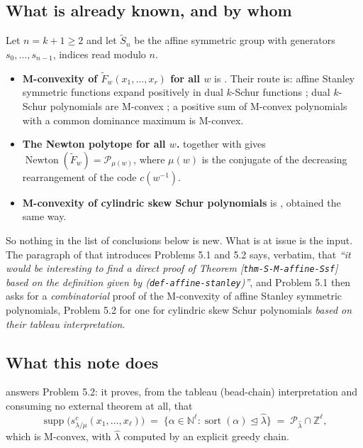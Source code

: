 \documentclass[11pt]{article}
\theoremstyle{plain}
\theoremstyle{definition}
\DeclareMathOperator{\supp}{supp}
\DeclareMathOperator{\Newton}{Newton}
\DeclareMathOperator{\sort}{sort}
\newcommand{\Z}{\mathbb{Z}}
\newcommand{\N}{\mathbb{N}}
\newcommand{\Saff}{\widetilde{S}_{n}}
\newcommand{\Fw}{\widetilde{F}_{w}}
\newcommand{\Perm}{\mathcal{P}}
\begin{document}
\subsection{What is already known, and by whom}\label{ss:known}

Let $n=k+1\ge 2$ and let $\Saff$ be the affine symmetric group with generators
$s_0,\dots,s_{n-1}$, indices read modulo $n$.

\begin{itemize}
\item \textbf{M-convexity of $\Fw(x_1,\dots,x_r)$ for all $w$} is
\cite[\texttt{thm-SNP-affine-Ssf}]{WZZ}. Their route is: affine Stanley symmetric functions
expand positively in dual $k$-Schur functions \cite[Cor.~8.5]{Lam2008}; dual $k$-Schur
polynomials are M-convex \cite[Thm.~4.4]{WZZ}; a positive sum of M-convex polynomials with a
common dominance maximum is M-convex.
\item \textbf{The Newton polytope for all $w$.} \cite[\texttt{thm-SNP-affine-Schur-combin}]{WZZ}
together with \cite[\texttt{thm:monomial}]{Lam2006} gives
$\Newton(\Fw)=\Perm_{\mu(w)}$, where $\mu(w)$ is the conjugate of the decreasing rearrangement
of the code $c(w^{-1})$.
\item \textbf{M-convexity of cylindric skew Schur polynomials} is
\cite[\texttt{thm-SNP-cylindric-skew-Schur-function}]{WZZ}, obtained the same way.
\end{itemize}

So nothing in the list of conclusions below is new. What is at issue is the input. The
paragraph of \cite{WZZ} that introduces Problems 5.1 and 5.2 says, verbatim, that
\emph{``it would be interesting to find a direct proof of Theorem
[\texttt{thm-S-M-affine-Ssf}] based on the definition given by (\texttt{def-affine-stanley})''},
and Problem 5.1 then asks for a \emph{combinatorial} proof of the M-convexity of affine
Stanley symmetric polynomials, Problem 5.2 for one for cylindric skew Schur polynomials
\emph{based on their tableau interpretation}.

\subsection{What this note does}

\cite{Clio2026} answers Problem 5.2: it proves, from the tableau (bead-chain) interpretation
and consuming no external theorem at all, that
\begin{equation}\label{eq:clio}
  \supp\bigl(s^{c}_{\lambda/\mu}(x_1,\dots,x_\ell)\bigr)
  \;=\;\{\alpha\in\N^{\ell}:\sort(\alpha)\trianglelefteq\hat\lambda\}
  \;=\;\Perm_{\hat\lambda}\cap\Z^{\ell},
\end{equation}
which is M-convex, with $\hat\lambda$ computed by an explicit greedy chain.
\end{document}
